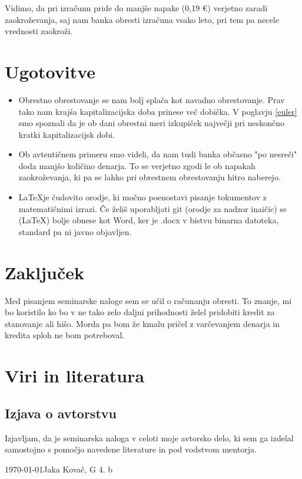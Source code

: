 \documentclass[12pt]{article}
\begin{document}
    Vidimo, da pri izračunu pride do manjše napake (0,19 €) verjetno zaradi zaokroževanja,
    saj nam banka obresti izračuna vsako leto, pri tem pa necele vrednosti zaokroži.

    \newpage

\section{Ugotovitve}
    \begin{itemize}
        \item Obrestno obrestovanje se nam bolj splača kot navadno obrestovanje. Prav tako nam
        krajša kapitalizacijska doba prinese več dobička. V poglavju \ref{euler} smo spoznali
        da je ob dani obrestni meri izkupiček največji pri neskončno kratki kapitalizacijsk dobi.
        \item Ob avtentičnem primeru smo videli, da nam tudi banka občasno "po nesreči" doda
        manjšo količino denarja. To se verjetno zgodi le ob napakah zaokroževanja, ki pa se lahko 
        pri obrestnem obrestovanju hitro naberejo.
        \item \LaTeX je čudovito orodje, ki močno poenostavi pisanje tokumentov z matematičnimi
        izrazi. Če želiš uporabljati git (orodje za nadzor inaičic) se (\LaTeX) bolje obnese kot Word,
        ker je .docx v bistvu binarna datoteka, standard pa ni javno objavljen.
    \end{itemize}

\newpage
\section{Zaključek}
    Med pisanjem seminarske naloge sem se učil o računanju obresti. To znanje, mi bo koristilo
    ko bo v ne tako zelo daljni prihodnosti želel pridobiti kredit za stanovanje ali hišo.
    Morda pa bom že kmalu pričel z varčevanjem denarja in kredita sploh ne bom potreboval. 



\newpage
\begingroup
\makeatletter
    \section{Viri in literatura}
    \nocite{*}
    \printbibliography[heading=none]
\makeatother
\endgroup
\newpage

\begin{samepage}
    \thispagestyle{empty}
    \section*{Izjava o avtorstvu}
    Izjavljam, da je seminarska naloga v celoti moje avtorsko delo, ki sem ga 
    izdelal samostojno s pomočjo navedene literature in pod vodstvom mentorja.

    \vfill
    
    \today \hfill Jaka Kovač, G 4. b
    
    \vspace{3 cm}
\end{samepage}
\end{document}
